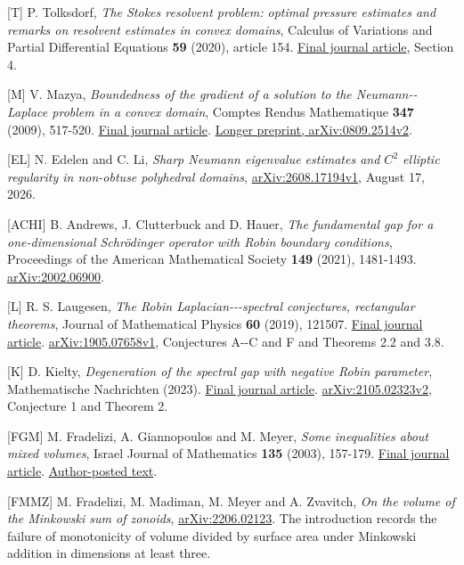 \documentclass[11pt]{article}
\begin{document}
{[}T{]} P. Tolksdorf, \emph{The Stokes resolvent problem: optimal
pressure estimates and remarks on resolvent estimates in convex
domains}, Calculus of Variations and Partial Differential Equations
\textbf{59} (2020), article 154.
\href{https://doi.org/10.1007/s00526-020-01811-8}{Final journal
article}, Section 4.

{[}M{]} V. Maz\textquotesingle ya, \emph{Boundedness of the gradient of
a solution to the Neumann-\/-Laplace problem in a convex domain},
Comptes Rendus Mathematique \textbf{347} (2009), 517-520.
\href{https://doi.org/10.1016/j.crma.2009.03.001}{Final journal
article}. \href{https://arxiv.org/abs/0809.2514v2}{Longer preprint,
arXiv:0809.2514v2}.

{[}EL{]} N. Edelen and C. Li, \emph{Sharp Neumann eigenvalue estimates
and \(C^2\) elliptic regularity in non-obtuse polyhedral domains},
\href{https://arxiv.org/abs/2608.17194v1}{arXiv:2608.17194v1}, August
17, 2026.

{[}ACHI{]} B. Andrews, J. Clutterbuck and D. Hauer, \emph{The
fundamental gap for a one-dimensional Schrödinger operator with Robin
boundary conditions}, Proceedings of the American Mathematical Society
\textbf{149} (2021), 1481-1493.
\href{https://arxiv.org/abs/2002.06900}{arXiv:2002.06900}.

{[}L{]} R. S. Laugesen, \emph{The Robin Laplacian-\/-\/-spectral
conjectures, rectangular theorems}, Journal of Mathematical Physics
\textbf{60} (2019), 121507.
\href{https://doi.org/10.1063/1.5116253}{Final journal article}.
\href{https://arxiv.org/abs/1905.07658v1}{arXiv:1905.07658v1},
Conjectures A-\/-C and F and Theorems 2.2 and 3.8.

{[}K{]} D. Kielty, \emph{Degeneration of the spectral gap with negative
Robin parameter}, Mathematische Nachrichten (2023).
\href{https://doi.org/10.1002/mana.202200121}{Final journal article}.
\href{https://arxiv.org/abs/2105.02323v2}{arXiv:2105.02323v2},
Conjecture 1 and Theorem 2.

{[}FGM{]} M. Fradelizi, A. Giannopoulos and M. Meyer, \emph{Some
inequalities about mixed volumes}, Israel Journal of Mathematics
\textbf{135} (2003), 157-179.
\href{https://doi.org/10.1007/BF02776055}{Final journal article}.
\href{https://perso.math.u-pem.fr/fradelizi.matthieu/pdf/mixedvolumes.pdf}{Author-posted
text}.

{[}FMMZ{]} M. Fradelizi, M. Madiman, M. Meyer and A. Zvavitch, \emph{On
the volume of the Minkowski sum of zonoids},
\href{https://arxiv.org/abs/2206.02123}{arXiv:2206.02123}. The
introduction records the failure of monotonicity of volume divided by
surface area under Minkowski addition in dimensions at least three.
\end{document}
